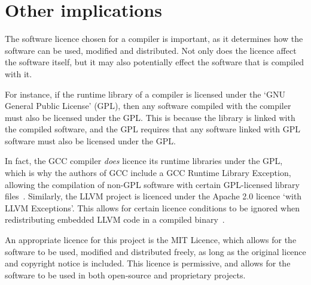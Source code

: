 \section{Other implications}

The software licence chosen for a compiler is important, as it determines how the software can be
used, modified and distributed. Not only does the licence affect the software itself, but it may
also potentially effect the software that is compiled with it.

For instance, if the runtime library of a compiler is licensed under the `GNU General Public
License' (GPL), then any software compiled with the compiler must also be licensed under the GPL.
This is because the library is linked with the compiled software, and the GPL requires that any
software linked with GPL software must also be licensed under the GPL.

In fact, the GCC compiler \emph{does} licence its runtime libraries under the GPL, which is why the
authors of GCC include a GCC Runtime Library Exception, allowing the compilation of non-GPL software
with certain GPL-licensed library files~\autocite{gcc-exception}. Similarly, the LLVM project is
licenced under the Apache 2.0 licence `with LLVM Exceptions'. This allows for certain licence conditions
to be ignored when redistributing embedded LLVM code in a compiled binary~\autocite{llvm-licence}.

An appropriate licence for this project is the MIT Licence, which allows for the software to be
used, modified and distributed freely, as long as the original licence and copyright notice is
included. This licence is permissive, and allows for the software to be used in both open-source and
proprietary projects.
